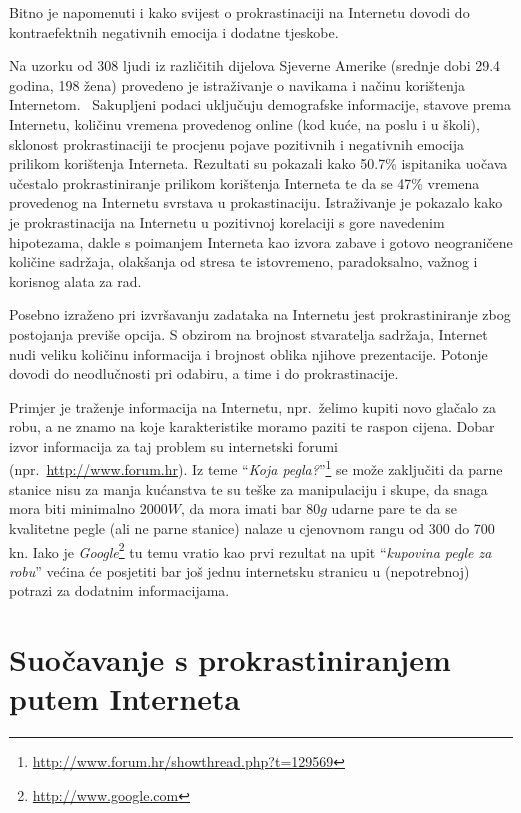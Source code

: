 \documentclass[11pt,twocolumn,english]{article}
\begin{document}
Bitno je napomenuti i kako svijest o prokrastinaciji na Internetu dovodi do kontraefektnih negativnih 
emocija i dodatne tjeskobe. \cite{Kraut98internet}

Na uzorku od 308 ljudi iz različitih dijelova Sjeverne Amerike (srednje dobi 29.4 godina, 198 žena)
provedeno je istraživanje o navikama i načinu korištenja Internetom.~ Sakupljeni
podaci uključuju demografske informacije, stavove prema Internetu, količinu vremena
provedenog online (kod kuće, na poslu i u školi), sklonost prokrastinaciji te procjenu
pojave pozitivnih i negativnih emocija prilikom korištenja Interneta. 
Rezultati su pokazali kako 50.7\% ispitanika uočava učestalo prokrastiniranje prilikom
korištenja Interneta te da se 47\% vremena provedenog na Internetu svrstava u prokastinaciju.
Istraživanje je pokazalo kako je prokrastinacija na Internetu u pozitivnoj korelaciji s gore navedenim 
hipotezama, dakle s poimanjem Interneta kao izvora zabave i gotovo neograničene količine sadržaja, olakšanja 
od stresa te istovremeno, paradoksalno, važnog i korisnog alata za rad. \cite{Lavoie01cyberslacking}

Posebno izraženo pri izvršavanju zadataka na Internetu jest prokrastiniranje zbog 
postojanja previše opcija. S obzirom na brojnost stvaratelja sadržaja, Internet
nudi veliku količinu informacija i brojnost oblika njihove prezentacije. Potonje dovodi 
do neodlučnosti pri odabiru, a time i do prokrastinacije.

Primjer je traženje informacija na Internetu, npr.~želimo kupiti novo glačalo
za robu, a ne znamo na koje karakteristike moramo paziti te raspon cijena. 
Dobar izvor informacija za taj problem su internetski forumi
(npr.~\url{http://www.forum.hr}). Iz teme ``\emph{Koja pegla?}''\footnote{\url{http://www.forum.hr/showthread.php?t=129569}}
se može zaključiti da parne stanice nisu za manja kućanstva te su teške za
manipulaciju i skupe, da snaga mora biti minimalno $2000 W$, da mora
imati bar $80 g$ udarne pare te da se kvalitetne pegle (ali ne parne stanice)
nalaze u cjenovnom rangu od 300 do 700 kn. Iako je
\emph{Google}\footnote{\url{http://www.google.com}} tu temu vratio kao prvi
rezultat na upit ``\emph{kupovina pegle za robu}'' većina će posjetiti bar još
jednu internetsku stranicu u (nepotrebnoj) potrazi za dodatnim informacijama.


\section{Suočavanje s prokrastiniranjem putem Interneta}
\end{document}
